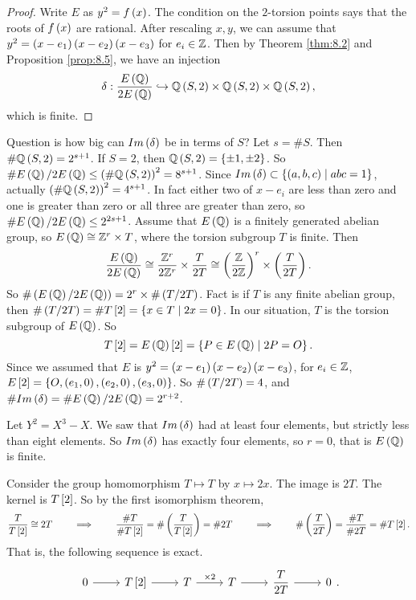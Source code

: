 \begin{proof}
Write $ E $ as $ y^2 = f\rb{x} $. The condition on the $ 2 $-torsion points says that the roots of $ f\rb{x} $ are rational. After rescaling $ x, y $, we can assume that $ y^2 = \rb{x - e_1}\rb{x - e_2}\rb{x - e_3} $ for $ e_i \in \Z $. Then by Theorem \ref{thm:8.2} and Proposition \ref{prop:8.5}, we have an injection
$$ \delta : \dfrac{E\rb{\Q}}{2E\rb{\Q}} \hookrightarrow \Q\rb{S, 2} \times \Q\rb{S, 2} \times \Q\rb{S, 2}, $$
which is finite.
\end{proof}

Question is how big can $ Im\rb{\delta} $ be in terms of $ S $? Let $ s = \#S $. Then $ \#\Q\rb{S, 2} = 2^{s + 1} $. If $ S = 2 $, then $ \Q\rb{S, 2} = \cb{\pm 1, \pm 2} $. So $ \#E\rb{\Q} / 2E\rb{\Q} \le \rb{\#\Q\rb{S, 2}}^2 = 8^{s + 1} $. Since $ Im\rb{\delta} \subset \cb{\rb{a, b, c} \mid abc = 1} $, actually $ \rb{\#\Q\rb{S, 2}}^2 = 4^{s + 1} $. In fact either two of $ x - e_i $ are less than zero and one is greater than zero or all three are greater than zero, so $ \#E\rb{\Q} / 2E\rb{\Q} \le 2^{2s + 1} $. Assume that $ E\rb{\Q} $ is a finitely generated abelian group, so $ E\rb{\Q} \cong \Z^r \times T $, where the torsion subgroup $ T $ is finite. Then
$$ \dfrac{E\rb{\Q}}{2E\rb{\Q}} \cong \dfrac{\Z^r}{2\Z^r} \times \dfrac{T}{2T} \cong \rb{\dfrac{\Z}{2\Z}}^r \times \rb{\dfrac{T}{2T}}. $$
So $ \#\rb{E\rb{\Q} / 2E\rb{\Q}} = 2^r \times \#\rb{T / 2T} $. Fact is if $ T $ is any finite abelian group, then $ \#\rb{T / 2T} = \#T\sb{2} = \cb{x \in T \mid 2x = 0} $. In our situation, $ T $ is the torsion subgroup of $ E\rb{\Q} $. So
$$ T\sb{2} = E\rb{\Q}\sb{2} = \cb{P \in E\rb{\Q} \mid 2P = O}. $$
Since we assumed that $ E $ is $ y^2 = \rb{x - e_1}\rb{x - e_2}\rb{x - e_3} $, for $ e_i \in \Z $, $ E\sb{2} = \cb{O, \rb{e_1, 0}, \rb{e_2, 0}, \rb{e_3, 0}} $. So $ \#\rb{T / 2T} = 4 $, and $ \#Im\rb{\delta} = \#E\rb{\Q} / 2E\rb{\Q} = 2^{r + 2} $.

\begin{example*}
Let $ Y^2 = X^3 - X $. We saw that $ Im\rb{\delta} $ had at least four elements, but strictly less than eight elements. So $ Im\rb{\delta} $ has exactly four elements, so $ r = 0 $, that is $ E\rb{\Q} $ is finite.
\end{example*}

\pagebreak

Consider the group homomorphism $ T \mapsto T $ by $ x \mapsto 2x $. The image is $ 2T $. The kernel is $ T\sb{2} $. So by the first isomorphism theorem,
$$ \dfrac{T}{T\sb{2}} \cong 2T \qquad \implies \qquad \dfrac{\#T}{\#T\sb{2}} = \#\rb{\dfrac{T}{T\sb{2}}} = \#2T \qquad \implies \qquad \#\rb{\dfrac{T}{2T}} = \dfrac{\#T}{\#2T} = \#T\sb{2}. $$
That is, the following sequence is exact.
$$
\begin{tikzcd}
0 \arrow{r} & T\sb{2} \arrow{r} & T \arrow{r}{\times 2} & T \arrow{r} & \dfrac{T}{2T} \arrow{r} & 0
\end{tikzcd}.
$$

